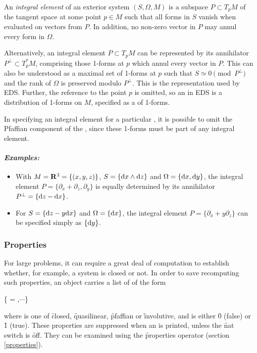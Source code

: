 An {\it integral element} of an exterior system $(S,\Omega,M)$ is a
subspace $P\subset T_pM$ of the tangent space at some point $p\in M$
such that all forms in $S$ vanish when evaluated on vectors from $P$. In
addition, no non-zero vector in $P$ may annul every form in $\Omega$. 

Alternatively, an integral element $P\subset T_pM$ can be represented
by its annihilator $P^\perp\subset T^*_pM$, comprising those 1-forms
at $p$ which annul every vector in $P$. This can also be understood as a
maximal set of 1-forms at $p$ such that $S \simeq 0 \pmod{P^\perp}$ and
the rank of $\Omega$ is preserved modulo $P^\perp$.  This is the
representation used by EDS. Further, the reference to the point $p$ is
omitted, so an  in EDS is a distribution of
1-forms on $M$, specified as a  of 1-forms. 

In specifying an integral element for a particular , it is
possible to omit the Pfaffian component of the , since these
1-forms must be part of any integral element.

\paragraph{\it Examples:}
\begin{itemize}
\item With $M = \mathbf{R}^3 = \{(x,y,z)\}$, $S = \{\mathrm{d} x\wedge \mathrm{d} z\}$ and
      $\Omega = \{\mathrm{d} x,\mathrm{d} y\}$, the integral element $P =
       \{\partial_x + \partial_z,\partial_y\}$ is equally determined by its
      annihilator $P^\perp = \{\mathrm{d} z - \mathrm{d} x\}$. 
\item For $S = \{\mathrm{d} z - y\mathrm{d} x\}$ and $\Omega = \{\mathrm{d} x\}$, the integral
      element $P = \{\partial_x + y\partial_z\}$ can be specified
      simply as $\{\mathrm{d} y\}$.
\end{itemize}

\subsubsection{Properties}
\label{Properties}

For large problems, it can require a great deal of computation to establish
whether, for example, a system is closed or not. In order to save
recomputing such properties, an  object carries a list of
 of the form
\begin{edssyntax}
	\{ = ,$\cdots$\}
\end{edssyntax}
where  is one of \f{closed}, \f{quasilinear}, \f{pfaffian} or
\f{involutive}, and  is either \f{0} (false) or \f{1}
(true). These properties are suppressed when an  is printed,
unless the \f{nat} switch is \f{off}. They can be examined using the
\f{properties} operator (section \ref{properties}).

